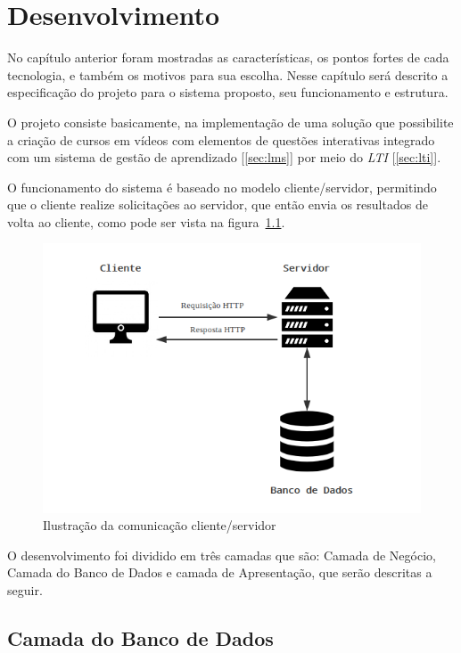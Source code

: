 \chapter{Desenvolvimento}

No capítulo anterior foram mostradas as características, os pontos fortes de cada tecnologia, e também os motivos para sua escolha. Nesse capítulo será descrito a especificação do projeto para o sistema proposto, seu funcionamento e estrutura.

O projeto consiste basicamente, na implementação de uma solução que possibilite a criação de cursos em vídeos com elementos de questões interativas integrado com um sistema de gestão de aprendizado [\autoref{sec:lms}] por meio do \textit{LTI} [\autoref{sec:lti}].

O funcionamento do sistema é baseado no modelo cliente/servidor, permitindo que o cliente realize solicitações ao servidor, que então envia os resultados de volta ao cliente, como pode ser vista na figura~\ref{fig:comunicacao-cliente-servidor}.

\begin{figure}[h]
    \centering
    \includegraphics[keepaspectratio=true,scale=0.7]{figuras/comunicacao_cliente_servidor.png}
    \caption{Ilustração da comunicação cliente/servidor}
    \label{fig:comunicacao-cliente-servidor}
\end{figure}

O desenvolvimento foi dividido em três camadas que são: Camada de Negócio, Camada do Banco de Dados e camada de Apresentação, que serão descritas a seguir.

\section{Camada do Banco de Dados}

